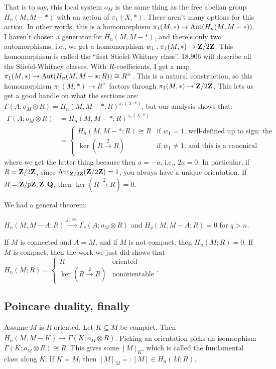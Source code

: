 That is to say, this local system $o_M$ is the same thing as the free abelian group $H_n(M,M-\ast)$ with an action of $\pi_1(X,\ast)$. There aren't many options for this action. In other words, this is a homomorphism $\pi_1(M,\ast)\to \operatorname{Aut}(H_n(M,M-\ast))$. I haven't chosen a generator for $H_n(M,M-\ast)$, and there's only two automorphisms, i.e., we get a homomorphism $w_1:\pi_1(M,\ast)\to\mathbf Z/2\mathbf Z$. This homomorphism is called the ``first Stiefel-Whitney class''. 18.906 will describe all the Stiefel-Whitney classes. With $R$-coefficients, I get a map $\pi_1(M,\ast)\to \operatorname{Aut}(H_n(M,M-\ast;R))\cong R^\times$. This is a natural construction, so this homomorphism $\pi_1(M,\ast)\to R^\times$ factors through $\pi_1(M,\ast)\to\mathbf Z/2\mathbf Z$. This lets us get a good handle on what the sections are: $\Gamma(A;o_M\otimes R)=H_n(M,M-\ast;R)^{\pi_1(X,\ast)}$, but our analysis shows that:
\begin{align*}
\Gamma(A;o_M\otimes R) & =H_n(M,M-\ast;R)^{\pi_1(X,\ast)}\\
& =\begin{cases}
H_n(M,M-\ast;R)\cong R & \text{if }w_1=1\text{, well-defined up to sign; the orientable case}\\
\ker(R\xrightarrow{2}R) & \text{if }w_1\neq 1\text{, and this is a canonical identification}
\end{cases}
\end{align*}
where we get the latter thing because then $a=-a$, i.e., $2a=0$. In particular, if $R=\mathbf Z/2\mathbf Z$, since $\operatorname{Aut}_{\mathbf Z/2\mathbf Z}(\mathbf Z/2\mathbf Z)=1$, you always have a unique orientation. If $R=\mathbf Z/p\mathbf Z,\mathbf Z,\mathbf Q$, then $\ker(R\xrightarrow{2}R)=0$.

We had a general theorem:
\begin{theorem}
$H_n(M,M-A;R)\xrightarrow{j,\cong}\Gamma_c(A;o_M\otimes R)$ and $H_q(M,M-A;R)=0$ for $q>n$.
\end{theorem}
\begin{corollary}
If $M$ is connected and $A=M$, and if $M$ is not compact, then $H_n(M;R)=0$. If $M$ is compact, then the work we just did shows that $H_n(M;R)=\begin{cases}R & \text{oriented} \\ \ker(R\xrightarrow{2}R) & \text{nonorientable}\end{cases}$.
\end{corollary}
\subsection{Poincare duality, finally}
Assume $M$ is $R$-oriented. Let $K\subseteq M$ be compact. Then $H_n(M,M-K)\xrightarrow{\cong}\Gamma(K;o_M\otimes R)$. Picking an orientation picks an isomorphism $\Gamma(K;o_M\otimes R)\cong R$. This gives some $[M]_K$, which is called the fundamental class along $K$. If $K=M$, then $[M]_M=:[M]\in H_n(M;R)$.

